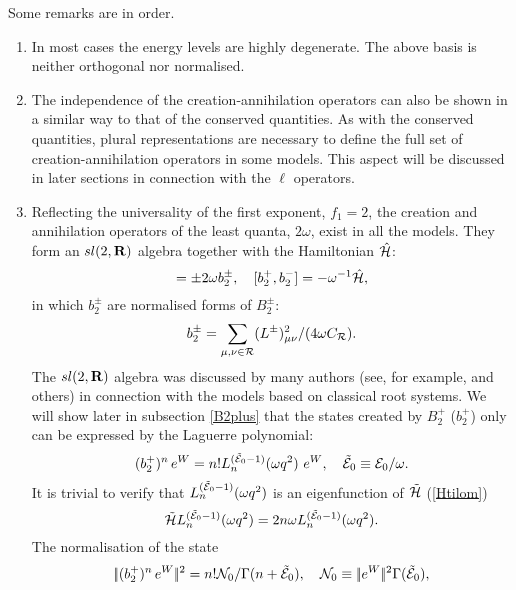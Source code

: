 \documentclass[a4paper,12pt]{article}
\begin{document}
Some remarks are in order.
\begin{enumerate}
\item
In most cases the energy levels are highly degenerate.
The above basis is neither
orthogonal nor normalised.
\item
The independence of the creation-annihilation operators can also be shown
in a similar way to that of the conserved quantities.
 As with the
conserved quantities,  plural representations are  necessary to define
the full set of creation-annihilation operators in some models.
This aspect will be discussed in later sections in
connection with the \(\ell\) operators.
\item
Reflecting the universality of the first exponent, \(f_1=2\),
the creation and annihilation operators of the
least quanta, \(2\omega\), exist in all the models.
They form an \(sl(2,{\bf R})\) algebra
together with the Hamiltonian \(\hat{\cal H}\):
\begin{equation}
   [\hat{\cal H},b^\pm_2]=\pm2\omega b^\pm_2,\quad
   [b_2^+,b_2^-]=-\omega^{-1}\hat{\cal H},
\end{equation}
in which \(b_2^\pm\) are  normalised forms of \(B_2^\pm\):
\begin{equation}
   b_2^\pm=\sum_{\mu,\nu\in{\cal R}}(L^\pm)^2_{\mu\nu}/(4\omega C_{\cal
   R}).
\label{normb2def}
\end{equation}
 The \(sl(2,{\bf R})\) algebra was discussed by many authors
(see, for example, \cite{Pere1,Gamb,Br,Heck2} and others) in connection
with  the models based on classical root systems. We will show later in
subsection
\ref{B2plus} that the
states created by
\(B_2^+\) (\(b_2^+\)) only can be expressed by  the Laguerre polynomial:
\begin{equation}
   (b_2^+)^n\,e^W=n! L^{(\tilde {\cal E}_0-1)}_n(\omega q^2)~e^W,\quad
   \tilde {\cal E}_0\equiv{\cal E}_0/\omega.
   \label{B2series}
\end{equation}
It is trivial to verify that \(L^{(\tilde {\cal E}_0-1)}_n(\omega q^2)\)
is an eigenfunction of \(\tilde{\cal H}\) (\ref{Htilom})
\begin{equation}
   \tilde{\cal H}L^{(\tilde {\cal E}_0-1)}_n(\omega q^2)=
   2n\omega L^{(\tilde
   {\cal E}_0-1)}_n(\omega q^2).
\end{equation}
The normalisation of the state
\begin{equation}
   |\!|(b_2^+)^n\,e^W|\!|^2=n!{\cal N}_0/\Gamma(n+\tilde
   {\cal E}_0),\quad {\cal N}_0\equiv|\!|e^W|\!|^2\Gamma(\tilde
   {\cal E}_0),
\end{equation}

\end{enumerate}
\end{document}
